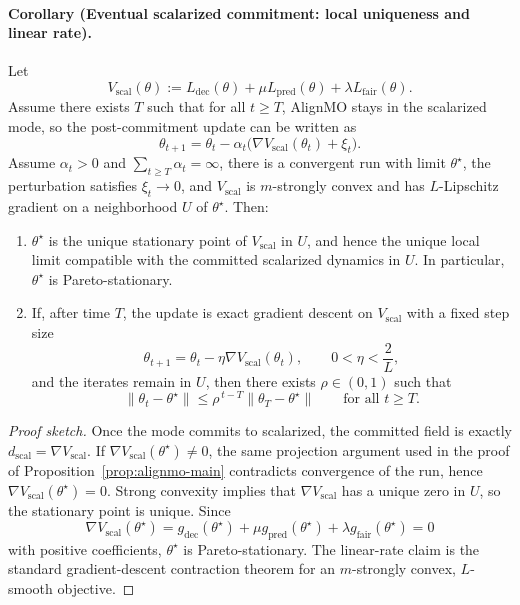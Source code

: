 \paragraph{Corollary (Eventual scalarized commitment: local uniqueness and linear rate).}
Let
\[
V_{\mathrm{scal}}(\theta)
:=
L_{\mathrm{dec}}(\theta)+\mu L_{\mathrm{pred}}(\theta)+\lambda L_{\mathrm{fair}}(\theta).
\]
Assume there exists $T$ such that for all $t\ge T$, AlignMO stays in the scalarized mode, so the
post-commitment update can be written as
\[
\theta_{t+1}=\theta_t-\alpha_t\bigl(\nabla V_{\mathrm{scal}}(\theta_t)+\xi_t\bigr).
\]
Assume $\alpha_t>0$ and $\sum_{t\ge T}\alpha_t=\infty$, there is a convergent run with limit $\theta^\star$,
the perturbation satisfies $\xi_t\to 0$,
and $V_{\mathrm{scal}}$ is $m$-strongly convex and has $L$-Lipschitz gradient
on a neighborhood $U$ of $\theta^\star$.
Then:
\begin{enumerate}
\item $\theta^\star$ is the unique stationary point of $V_{\mathrm{scal}}$ in $U$, and hence the unique local limit compatible with the committed scalarized dynamics in $U$. In particular, $\theta^\star$ is Pareto-stationary.
\item If, after time $T$, the update is exact gradient descent on $V_{\mathrm{scal}}$ with a fixed step size
      \[
      \theta_{t+1}=\theta_t-\eta \nabla V_{\mathrm{scal}}(\theta_t),
      \qquad 0<\eta<\frac{2}{L},
      \]
      and the iterates remain in $U$, then there exists $\rho\in(0,1)$ such that
      \[
      \|\theta_t-\theta^\star\|\le \rho^{\,t-T}\|\theta_T-\theta^\star\|
      \qquad\text{for all } t\ge T.
      \]
\end{enumerate}

\begin{proof}[Proof sketch]
Once the mode commits to scalarized, the committed field is exactly
$d_{\mathrm{scal}}=\nabla V_{\mathrm{scal}}$.
If $\nabla V_{\mathrm{scal}}(\theta^\star)\neq 0$, the same projection argument used in the proof of
Proposition~\ref{prop:alignmo-main} contradicts convergence of the run, hence
$\nabla V_{\mathrm{scal}}(\theta^\star)=0$.
Strong convexity implies that $\nabla V_{\mathrm{scal}}$ has a unique zero in $U$,
so the stationary point is unique. Since
\[
\nabla V_{\mathrm{scal}}(\theta^\star)
=
g_{\mathrm{dec}}(\theta^\star)+\mu g_{\mathrm{pred}}(\theta^\star)+\lambda g_{\mathrm{fair}}(\theta^\star)=0
\]
with positive coefficients, $\theta^\star$ is Pareto-stationary.
The linear-rate claim is the standard gradient-descent contraction theorem for an
$m$-strongly convex, $L$-smooth objective.
\end{proof}

